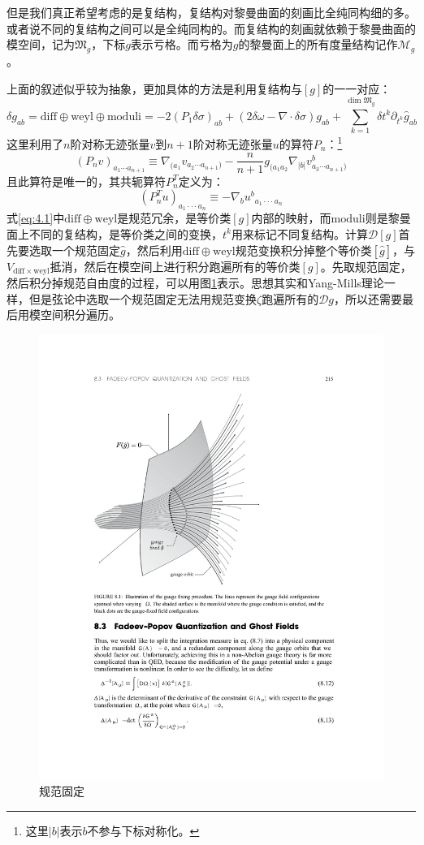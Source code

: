 但是我们真正希望考虑的是复结构，复结构对黎曼曲面的刻画比全纯同构细的多。或者说不同的复结构之间可以是全纯同构的。而复结构的刻画就依赖于黎曼曲面的模空间，记为$\mathfrak{M}_g$，下标$g$表示亏格。而亏格为$g$的黎曼面上的所有度量结构记作$\mathcal{M}_g$。

上面的叙述似乎较为抽象，更加具体的方法是利用复结构与$[g]$的一一对应：
\begin{equation}
	\label{eq:4.1}
	\delta g_{ab}=\mathrm{diff}\oplus\mathrm{weyl}\oplus\mathrm{moduli}=-2(P_1\delta\sigma)_{ab}+(2\delta\omega-\nabla\cdot\delta\sigma)g_{ab}+\sum_{k=1}^{\dim\mathfrak{M}_g}\delta t^k\partial_{t^k}\hat{g}_{ab}
\end{equation}
这里利用了$n$阶对称无迹张量$v$到$n+1$阶对称无迹张量$u$的算符$P_n$：\footnote{这里$|b|$表示$b$不参与下标对称化。}
\begin{equation}
	(P_nv)_{a_1\cdots a_{n+1}}\equiv\nabla_{(a_1}v_{a_2\cdots a_{n+1})}-\frac{n}{n+1}g_{(a_1a_2}\nabla_{|b|}v_{a_3\cdots a_{n+1})}^b
\end{equation}
且此算符是唯一的，其共轭算符$P_n^T$定义为：
\begin{equation}
	(P_n^Tu)_{a_1\cdot\cdot\cdot a_n}\equiv-\nabla_bu^b{}_{a_1\cdot\cdot\cdot a_n}
\end{equation}
式\ref{eq:4.1}中$\mathrm{diff}\oplus\mathrm{weyl}$是规范冗余，是等价类$[g]$内部的映射，而$\mathrm{moduli}$则是黎曼面上不同的复结构，是等价类之间的变换，$t^k$用来标记不同复结构。计算$\mathcal{D}[g]$首先要选取一个规范固定$\hat{g}$，然后利用$\mathrm{diff}\oplus\mathrm{weyl}$规范变换积分掉整个等价类$[\hat{g}]$，与$V_{\mathrm{diff}\times\mathrm{weyl}}$抵消，然后在模空间上进行积分跑遍所有的等价类$[g]$。先取规范固定，然后积分掉规范自由度的过程，可以用图\ref{fig:3}表示。思想其实和Yang-Mills理论一样，但是弦论中选取一个规范固定无法用规范变换$\zeta$跑遍所有的$\mathcal{D}g$，所以还需要最后用模空间积分遍历。
\begin{figure}[htbp]
	\centering
	\includegraphics[width=0.5\linewidth]{figs/fig3.pdf}
	\caption{规范固定}
	\label{fig:3}
\end{figure}


